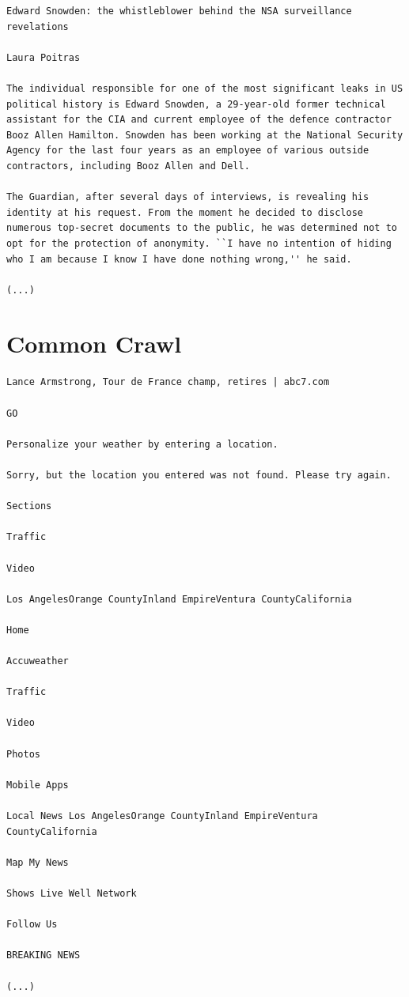 \documentclass[a4paper,12pt,titlepage=false]{scrreprt}
\begin{document}
\begin{lstlisting}[breaklines=true]
Edward Snowden: the whistleblower behind the NSA surveillance revelations

Laura Poitras

The individual responsible for one of the most significant leaks in US political history is Edward Snowden, a 29-year-old former technical assistant for the CIA and current employee of the defence contractor Booz Allen Hamilton. Snowden has been working at the National Security Agency for the last four years as an employee of various outside contractors, including Booz Allen and Dell.

The Guardian, after several days of interviews, is revealing his identity at his request. From the moment he decided to disclose numerous top-secret documents to the public, he was determined not to opt for the protection of anonymity. ``I have no intention of hiding who I am because I know I have done nothing wrong,'' he said.

(...)
\end{lstlisting}

\section{Common Crawl}

\begin{lstlisting}[breaklines=true]
Lance Armstrong, Tour de France champ, retires | abc7.com

GO

Personalize your weather by entering a location.

Sorry, but the location you entered was not found. Please try again.

Sections

Traffic

Video

Los AngelesOrange CountyInland EmpireVentura CountyCalifornia

Home

Accuweather

Traffic

Video

Photos

Mobile Apps

Local News Los AngelesOrange CountyInland EmpireVentura CountyCalifornia

Map My News

Shows Live Well Network

Follow Us

BREAKING NEWS

(...)
\end{lstlisting}
\end{document}
